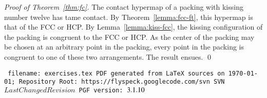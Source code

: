 \documentclass{llncs}
\def\svninfo{{\tt
  filename: exercises.tex\hfill\break
  PDF generated from LaTeX sources on \today; \hfill\break
  Repository Root: https://flyspeck.googlecode.com/svn \hfill\break
  SVN $LastChangedRevision$
  PGF version: $\pgftypesetversion$
  }
  }
\begin{document}
\begin{proof}[Proof of Theorem~\ref{thm:fc}]  
  The contact hypermap of a packing with kissing number twelve has tame
  contact.  By Theorem~\ref{lemma:fcc-ft}, this hypermap is that of
  the FCC or HCP.  By Lemma~\ref{lemma:kiss-fcc}, the kissing
  configuration of the packing is congruent to the FCC or HCP.  As the
  center of the packing may be chosen at an arbitrary point in the
  packing, every point in the packing is congruent to one of these two
  arrangements.  The result ensues.
\qed\end{proof}





\raggedright



\newpage
\bigskip
\noindent
\svninfo
\smallskip

\noindent
\endnote
\end{document}
